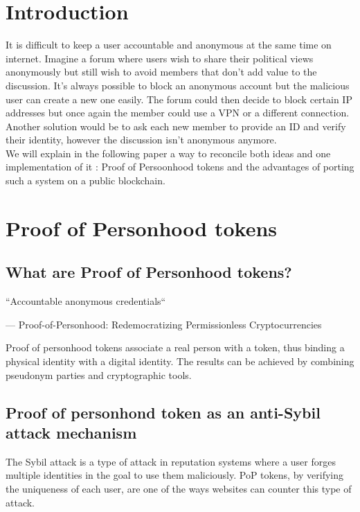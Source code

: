 \documentclass[11pt, a4paper, twoside, openright]{article} %
\begin{document}





\newpage

\tableofcontents
\newpage
\section{Introduction}


It is difficult to keep a user accountable and anonymous at the same time on internet. Imagine a forum where users wish to share their political views anonymously but still wish to avoid members that don't add value to the discussion. It's always possible to block an anonymous account but the malicious user can create a new one easily. The forum could then decide to block certain IP addresses but once again the member could use a VPN or a different connection. Another solution would be to ask each new member to provide an ID and verify their identity, however the discussion isn't anonymous anymore. \\
We will explain in the following paper a way to reconcile both ideas and one implementation of it : Proof of Persoonhood tokens and the advantages of porting such a system on a public blockchain.



\section{Proof of Personhood tokens}
\subsection{What are Proof of Personhood tokens?}

\epigraph{``Accountable anonymous credentials``}
{--- \textup{Proof-of-Personhood: Redemocratizing Permissionless Cryptocurrencies}}

Proof of personhood tokens associate a real person with a token, thus binding a physical identity with a digital identity. The results can be achieved by combining pseudonym parties and cryptographic tools.
\subsection{Proof of personhond token as an anti-Sybil attack mechanism}
The Sybil attack is a type of attack in reputation systems where a user forges multiple identities in the goal to use them maliciously. PoP tokens, by verifying the uniqueness of each user, are one of the ways websites can counter this type of attack.
\end{document}
